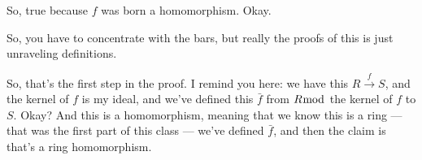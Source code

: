 \begin{proofWrapper}
\begin{speech}[01:00:17 - 01:01:57]
So, true because $f$ was born a homomorphism. Okay.
\end{speech}

\begin{speech}[01:01:57 - 01:02:41]
So, you have to concentrate with the bars, but really the proofs of this is just unraveling definitions. 

So, that's the first step in the proof. I remind you here: we have this $R \xrightarrow{f} S$,  and the kernel of $f$ is my ideal,  and we've defined this $\bar{f}$ from $R \bmod$ the kernel of $f$ to $S$.  Okay? And this is a homomorphism,  meaning that we know this is a ring --- that was the first part of this class --- we've defined $\bar{f}$, and then the claim is that's a ring homomorphism.
\end{speech}

\begin{content}


\end{content}
\end{proofWrapper}
